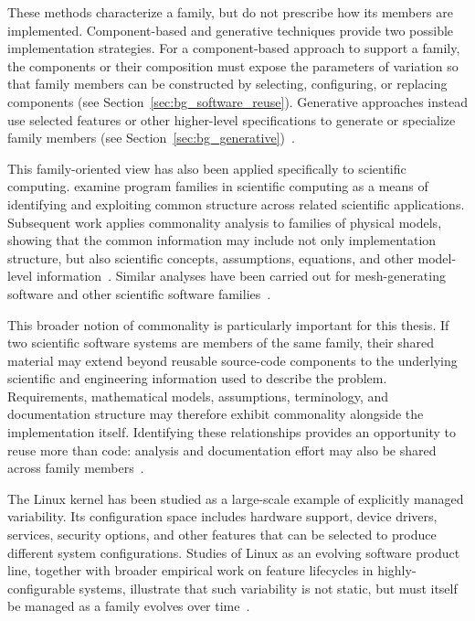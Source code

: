 These methods characterize a family, but do not prescribe how its members are
implemented. Component-based and generative techniques provide two possible
implementation strategies. For a component-based approach to support a family,
the components or their composition must expose the parameters of variation so
that family members can be constructed by selecting, configuring, or replacing
components (see Section~\ref{sec:bg_software_reuse}). Generative approaches
instead use selected features or other higher-level specifications to generate
or specialize family members (see Section~\ref{sec:bg_generative})~\citep{Pohl2005,
Czarnecki2000}.

This family-oriented view has also been applied specifically to scientific
computing. \citet{SmithMcCutchanAndCao2007} examine program families in scientific
computing as a means of identifying and exploiting common structure across
related scientific applications. Subsequent
work applies commonality analysis to families of physical models, showing
that the common information may include not only implementation structure,
but also scientific concepts, assumptions, equations, and other model-level
information~\citep{SmithEtAl2008}. Similar analyses have been carried out for
mesh-generating software and other scientific software 
families~\citep{SmithAndChen2004,SmithAndChen2004b}.

This broader notion of commonality is particularly important for this
thesis. If two scientific software systems are members of the same family,
their shared material may extend beyond reusable source-code components to
the underlying scientific and engineering information used to describe the
problem. Requirements, mathematical models, assumptions, terminology, and
documentation structure may therefore exhibit commonality alongside the
implementation itself. Identifying these relationships provides an
opportunity to reuse more than code: analysis and documentation effort may
also be shared across family members~\citep{SmithEtAl2008,SmithAndChen2004}.

The Linux kernel has been studied as a large-scale example of explicitly managed
variability. Its configuration space includes hardware support, device
drivers, services, security options, and other features that can be selected
to produce different system configurations. Studies of Linux as an evolving
software product line, together with broader empirical work on feature
lifecycles in highly-configurable systems, illustrate that such variability
is not static, but must itself be managed as a family evolves over
time~\citep{AttarianEtAl2011,michelon2021}.

